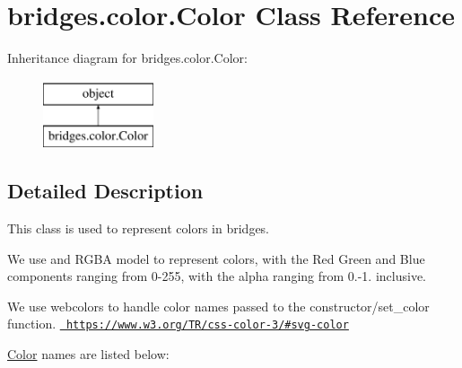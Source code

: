 \hypertarget{classbridges_1_1color_1_1_color}{}\section{bridges.\+color.\+Color Class Reference}
\label{classbridges_1_1color_1_1_color}
Inheritance diagram for bridges.\+color.\+Color\+:\begin{figure}[H]
\begin{center}
\leavevmode
\includegraphics[height=2.000000cm]{classbridges_1_1color_1_1_color}
\end{center}
\end{figure}


\subsection{Detailed Description}
This class is used to represent colors in bridges. 

We use and R\+G\+BA model to represent colors, with the Red Green and Blue components ranging from 0-\/255, with the alpha ranging from 0.-\/1. inclusive.

We use webcolors to handle color names passed to the constructor/set\+\_\+color function. \href{https://www.w3.org/TR/css-color-3/\#svg-color}{\texttt{ https\+://www.\+w3.\+org/\+T\+R/css-\/color-\/3/\#svg-\/color}}

\mbox{\hyperlink{classbridges_1_1color_1_1_color}{Color}} names are listed below\+:~\newline


